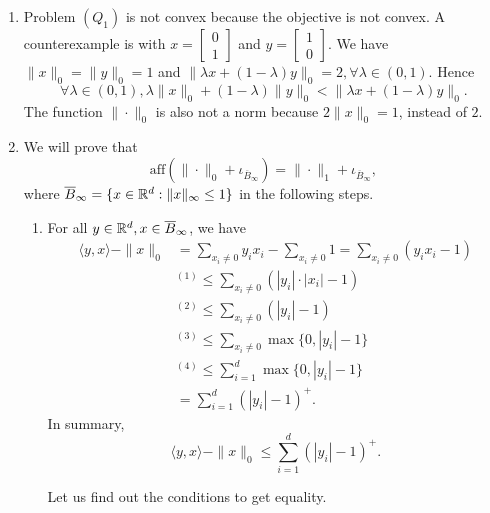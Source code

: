 \begin{enumerate}
  \item Problem $(Q_1)$ is not convex because the objective is not convex. A counterexample is with $x=\begin{bmatrix}
            0 \\1
          \end{bmatrix}$ and $y=\begin{bmatrix}
            1 \\0
          \end{bmatrix}$. We have $\|x\|_0 = \|y\|_0 = 1$ and $\|\lambda x + (1-\lambda) y\|_0 = 2, \forall \lambda\in(0,1)$. Hence
        $$\forall \lambda \in(0,1), \lambda \|x\|_0 + (1-\lambda) \|y\|_0 < \|\lambda x + (1-\lambda) y\|_0.$$
        The function $\|\cdot\|_0$ is also not a norm because $2\|x\|_0 = 1$, instead of $2$.
  \item We will prove that
        $$\mathrm{aff}(\|\cdot\|_0 + \iota_{\overline{B}_{\infty}}) = \|\cdot\|_1 + \iota_{\overline{B}_{\infty}},$$
        where $\overline{B}_{\infty} = \{x\in{\mathbb{R}}^d : \|x\|_{\infty} \le 1\}$ in the following steps.
        \begin{enumerate}[label=(\alph*)]
          \item For all $y\in{\mathbb{R}}^d, x\in \overline{B}_{\infty}$, we have
                \begin{align*}
                  \langle y,x\rangle - \|x\|_0
                   & = \sum\limits_{x_i\ne 0} y_ix_i - \sum\limits_{x_i\ne 0}1 = \sum\limits_{x_i\ne 0} (y_ix_i - 1) \\
                   & ^{(1)}\le \sum\limits_{x_i\ne 0} (|y_i|\cdot|x_i| - 1)                                          \\
                   & ^{(2)} \le \sum\limits_{x_i\ne 0} (|y_i| - 1)                                                   \\
                   & ^{(3)} \le \sum\limits_{x_i\ne 0} \max\{0, |y_i| - 1\}                                          \\
                   & ^{(4)}\le \sum\limits_{i=1}^d \max\{0, |y_i| - 1\}                                              \\
                   & = \sum\limits_{i=1}^d (|y_i| - 1)^+.
                \end{align*}
                In summary,
                $$\langle y,x\rangle - \|x\|_0 \le \sum\limits_{i=1}^d (|y_i| - 1)^+.$$

                Let us find out the conditions to get equality.


\end{enumerate}
\end{enumerate}
